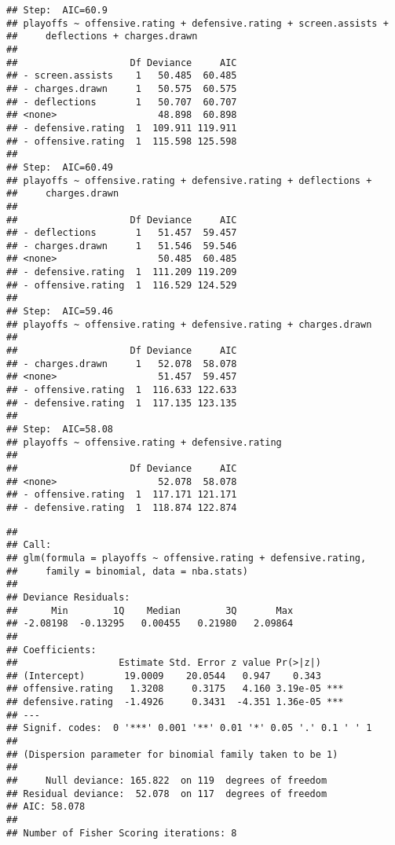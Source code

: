 \documentclass[
]{article}
\begin{document}
\begin{verbatim}
## Step:  AIC=60.9
## playoffs ~ offensive.rating + defensive.rating + screen.assists + 
##     deflections + charges.drawn
## 
##                    Df Deviance     AIC
## - screen.assists    1   50.485  60.485
## - charges.drawn     1   50.575  60.575
## - deflections       1   50.707  60.707
## <none>                  48.898  60.898
## - defensive.rating  1  109.911 119.911
## - offensive.rating  1  115.598 125.598
## 
## Step:  AIC=60.49
## playoffs ~ offensive.rating + defensive.rating + deflections + 
##     charges.drawn
## 
##                    Df Deviance     AIC
## - deflections       1   51.457  59.457
## - charges.drawn     1   51.546  59.546
## <none>                  50.485  60.485
## - defensive.rating  1  111.209 119.209
## - offensive.rating  1  116.529 124.529
## 
## Step:  AIC=59.46
## playoffs ~ offensive.rating + defensive.rating + charges.drawn
## 
##                    Df Deviance     AIC
## - charges.drawn     1   52.078  58.078
## <none>                  51.457  59.457
## - offensive.rating  1  116.633 122.633
## - defensive.rating  1  117.135 123.135
## 
## Step:  AIC=58.08
## playoffs ~ offensive.rating + defensive.rating
## 
##                    Df Deviance     AIC
## <none>                  52.078  58.078
## - offensive.rating  1  117.171 121.171
## - defensive.rating  1  118.874 122.874
\end{verbatim}

\begin{verbatim}
## 
## Call:
## glm(formula = playoffs ~ offensive.rating + defensive.rating, 
##     family = binomial, data = nba.stats)
## 
## Deviance Residuals: 
##      Min        1Q    Median        3Q       Max  
## -2.08198  -0.13295   0.00455   0.21980   2.09864  
## 
## Coefficients:
##                  Estimate Std. Error z value Pr(>|z|)    
## (Intercept)       19.0009    20.0544   0.947    0.343    
## offensive.rating   1.3208     0.3175   4.160 3.19e-05 ***
## defensive.rating  -1.4926     0.3431  -4.351 1.36e-05 ***
## ---
## Signif. codes:  0 '***' 0.001 '**' 0.01 '*' 0.05 '.' 0.1 ' ' 1
## 
## (Dispersion parameter for binomial family taken to be 1)
## 
##     Null deviance: 165.822  on 119  degrees of freedom
## Residual deviance:  52.078  on 117  degrees of freedom
## AIC: 58.078
## 
## Number of Fisher Scoring iterations: 8
\end{verbatim}
\end{document}
